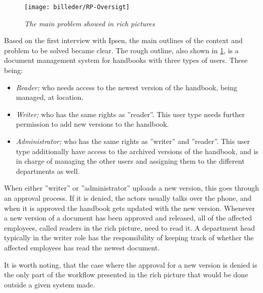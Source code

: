 \begin{figure}[H]
	\centering
	\texttt{[image: billeder/RP-Oversigt]}
	\caption{\textit{The main problem showed in rich pictures
	}}
	\label{fig:RP-Oversigt}
\end{figure}

Based on the first interview with Ipsen, the main outlines of the context and problem to be solved became clear.
The rough outline, also shown in \cref{fig:RP-Oversigt}, is a document management system for handbooks with three types of users.
These being:
\begin{itemize}
	\item
		\textit{Reader;} who needs access to the newest version of the handbook, being managed, at location.
	\item
		\textit{Writer;} who has the same rights as ''reader''.
		This user type needs further permission to add new versions to the handbook.
	\item
		\textit{Administrator;} who has the same rights as ''writer'' and ''reader''.
		This user type additionally have access to the archived versions of the handbook, and is in charge of managing the other users and assigning them to the different departments as well.
\end{itemize}

When either ''writer'' or ''administrator'' uploads a new version, this goes through an approval process.
If it is denied, the actors usually talks over the phone, and when it is approved the handbook gets updated with the new version.
Whenever a new version of a document has been approved and released, all of the affected employees, called readers in the rich picture, need to read it.
A department head typically in the writer role has the responsibility of keeping track of whether the affected employees has read the newest document.

It is worth noting, that the case where the approval for a new version is denied is the only part of the workflow presented in the rich picture that would be done outside a given system made.

